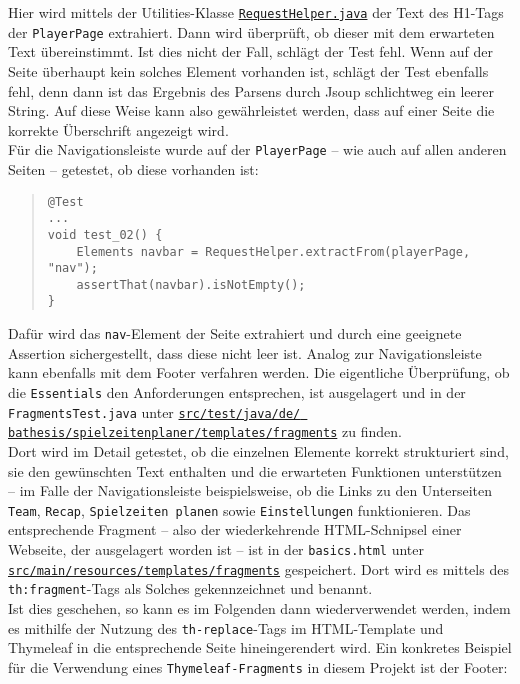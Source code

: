 Hier wird mittels der Utilities-Klasse \href{https://github.com/FlorianOhmes/bat_spielzeitenplaner/blob/main/spielzeitenplaner/src/test/java/de/bathesis/spielzeitenplaner/utilities/RequestHelper.java}{\texttt{RequestHelper.java}} der 
Text des H1-Tags der \texttt{PlayerPage} extrahiert. Dann wird überprüft, ob dieser 
mit dem erwarteten Text übereinstimmt. Ist dies nicht der Fall, schlägt der Test 
fehl. Wenn auf der Seite überhaupt kein solches Element vorhanden ist, schlägt der 
Test ebenfalls fehl, denn dann ist das Ergebnis des Parsens durch Jsoup schlichtweg 
ein leerer String. Auf diese Weise kann also gewährleistet werden, dass auf einer 
Seite die korrekte Überschrift angezeigt wird. \\ 
Für die Navigationsleiste wurde auf der \texttt{PlayerPage} -- wie auch auf allen 
anderen Seiten -- getestet, ob diese vorhanden ist: 

\begin{quote}
\begin{verbatim}
@Test
... 
void test_02() {
    Elements navbar = RequestHelper.extractFrom(playerPage, "nav");
    assertThat(navbar).isNotEmpty();
}
\end{verbatim}
\end{quote}

Dafür wird das \texttt{nav}-Element der Seite extrahiert und durch eine geeignete 
Assertion sichergestellt, dass diese nicht leer ist. Analog zur Navigationsleiste 
kann ebenfalls mit dem Footer verfahren werden. Die eigentliche Überprüfung, ob 
die \texttt{Essentials} den Anforderungen entsprechen, ist ausgelagert und in der 
\texttt{FragmentsTest.java} unter 
\href{https://github.com/FlorianOhmes/bat_spielzeitenplaner/blob/main/spielzeitenplaner/src/test/java/de/bathesis/spielzeitenplaner/templates/fragments/FragmentsTest.java}{\texttt{src/test/java/de/ \linebreak bathesis/spielzeitenplaner/templates/fragments}} 
zu finden. \\ 
Dort wird im Detail getestet, ob die einzelnen Elemente korrekt strukturiert sind, 
sie den gewünschten Text enthalten und die erwarteten Funktionen unterstützen -- im 
Falle der Navigationsleiste beispielsweise, ob die Links zu den Unterseiten 
\texttt{Team}, \texttt{Recap}, \texttt{Spielzeiten planen} sowie 
\texttt{Einstellungen} funktionieren. Das entsprechende Fragment -- also der 
wiederkehrende HTML-Schnipsel einer Webseite, der ausgelagert worden ist -- ist in 
der \texttt{basics.html} unter \href{https://github.com/FlorianOhmes/bat_spielzeitenplaner/tree/main/spielzeitenplaner/src/main/resources/templates/fragments}{\texttt{src/main/resources/templates/fragments}} 
gespeichert. Dort wird es mittels des \texttt{th:fragment}-Tags als Solches 
gekennzeichnet und benannt. \\ 
Ist dies geschehen, so kann es im Folgenden dann wiederverwendet werden, indem es 
mithilfe der Nutzung des \texttt{th-replace}-Tags im HTML-Template und Thymeleaf in 
die entsprechende Seite hineingerendert wird. Ein konkretes Beispiel für die 
Verwendung eines \texttt{Thymeleaf-Fragments} in diesem Projekt ist der Footer: 

